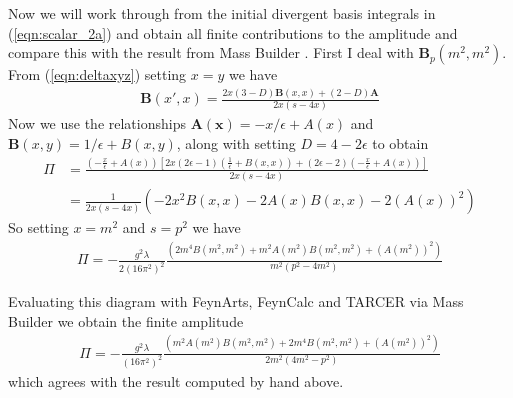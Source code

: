 \documentclass[11pt]{article}
\newcommand{\mb}{\textsf{Mass Builder} \! }
\begin{document}
Now we will work through from the initial divergent basis integrals in (\ref{eqn:scalar_2a}) and obtain all finite contributions to the amplitude and compare this with the result from \mb.  First I deal with $\mathbf{B}_p(m^2,m^2)$.  From (\ref{eqn:deltaxyz}) setting $x=y$ we have
\begin{align}
\mathbf{B}(x',x) = \frac{2x(3-D)\mathbf{B}(x,x)+(2-D)\mathbf{A}}{2x(s-4x)}
\end{align}
Now we use the relationships $\mathbf{A(x)} = -x/\epsilon +A(x)$ and $\mathbf{B}(x,y) = 1/\epsilon + B(x,y)$, along with setting $D = 4-2\epsilon$ to obtain
\begin{align*}
\Pi &= \frac{\left( -\frac{x}{\epsilon}+A(x)\right)\left[2x(2\epsilon-1)\left( \frac{1}{\epsilon}+B(x,x)\right) + (2\epsilon-2)\left(-\frac{x}{\epsilon}+A(x)\right)\right]}{2x(s-4x)}\\
&= \frac{1}{2x(s-4x)} \left(-2x^2B(x,x)-2A(x)B(x,x)-2(A(x))^2\right)
\end{align*}
So setting $x=m^2$ and $s=p^2$ we have
\begin{align}
\Pi = -\frac{g^2\lambda}{2(16\pi^2)^2} \frac{\left(2m^4B(m^2,m^2)+m^2A(m^2)B(m^2,m^2)+(A(m^2))^2\right)}{m^2(p^2-4m^2)}
\end{align}

Evaluating this diagram with FeynArts, FeynCalc and TARCER via \mb we obtain the finite amplitude
\begin{align}
\Pi = -\frac{g^2\lambda}{(16\pi^2)^2} \frac{ \left(m^2A(m^2)B(m^2,m^2) + 2m^4B(m^2,m^2) + (A(m^2))^2 \right) }{ 2m^2 (4m^2-p^2)}
\end{align}
which agrees with the result computed by hand above.
\end{document}
